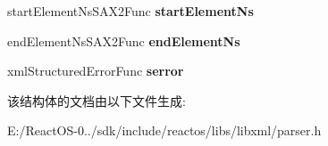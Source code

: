 \begin{DoxyCompactItemize}
\mbox{\label{struct__xml_s_a_x_handler_a62aaeb317e06a20f32b90f105003e45a}} 
start\+Element\+Ns\+S\+A\+X2\+Func {\bfseries start\+Element\+Ns}
\item 
\mbox{\label{struct__xml_s_a_x_handler_ac5d1d80f714269f30425206428c2675e}} 
end\+Element\+Ns\+S\+A\+X2\+Func {\bfseries end\+Element\+Ns}
\item 
\mbox{\label{struct__xml_s_a_x_handler_ae022c0ff2961999df734b58fc0832338}} 
xml\+Structured\+Error\+Func {\bfseries serror}
\end{DoxyCompactItemize}


该结构体的文档由以下文件生成\+:\begin{DoxyCompactItemize}
\item 
E\+:/\+React\+O\+S-\/0../sdk/include/reactos/libs/libxml/parser.\+h\end{DoxyCompactItemize}
